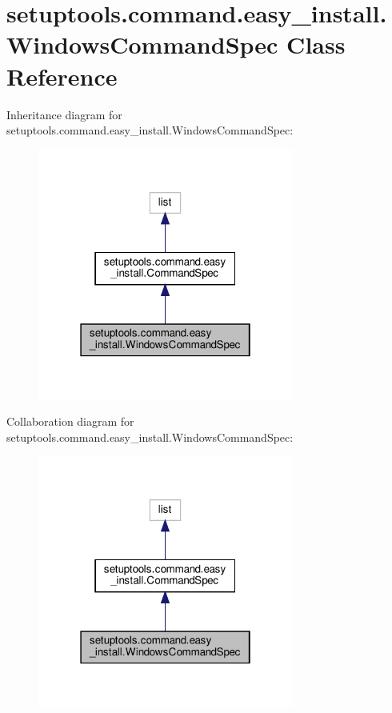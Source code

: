 \hypertarget{classsetuptools_1_1command_1_1easy__install_1_1WindowsCommandSpec}{}\section{setuptools.\+command.\+easy\+\_\+install.\+Windows\+Command\+Spec Class Reference}
\label{classsetuptools_1_1command_1_1easy__install_1_1WindowsCommandSpec}


Inheritance diagram for setuptools.\+command.\+easy\+\_\+install.\+Windows\+Command\+Spec\+:
\nopagebreak
\begin{figure}[H]
\begin{center}
\leavevmode
\includegraphics[width=238pt]{classsetuptools_1_1command_1_1easy__install_1_1WindowsCommandSpec__inherit__graph}
\end{center}
\end{figure}


Collaboration diagram for setuptools.\+command.\+easy\+\_\+install.\+Windows\+Command\+Spec\+:
\nopagebreak
\begin{figure}[H]
\begin{center}
\leavevmode
\includegraphics[width=238pt]{classsetuptools_1_1command_1_1easy__install_1_1WindowsCommandSpec__coll__graph}
\end{center}
\end{figure}
